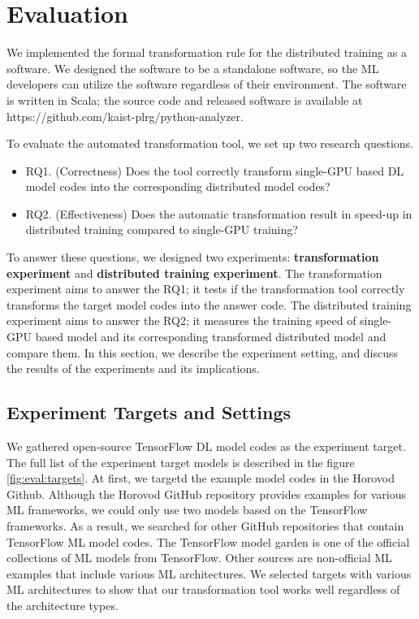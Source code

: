 \section{Evaluation}\label{sec:eval}

We implemented the formal transformation rule for the distributed training
as a software. We designed the software to be a standalone software, so 
the ML developers can utilize the software regardless of their environment. 
The software is written in Scala; the source code and released software
is available at https://github.com/kaist-plrg/python-analyzer.

To evaluate the automated transformation tool, we set up two research
questions.

\begin{itemize}
\item RQ1. (Correctness) Does the tool correctly transform single-GPU based DL model codes into
the corresponding distributed model codes?

\item RQ2. (Effectiveness) Does the automatic transformation result in speed-up 
in distributed training compared to single-GPU training?
\end{itemize}

To answer these questions,  
we designed two experiments: \textbf{transformation experiment} and
\textbf{distributed training experiment}.
The transformation experiment aims to answer the RQ1; it tests if the
transformation tool correctly transforms the target model codes into
the answer code.
The distributed training experiment aims to answer the RQ2;
it measures the training speed of single-GPU based model and its
corresponding transformed distributed model and compare them.
In this section, we describe the experiment setting,
and discuss the results of the experiments and its implications.

\subsection{Experiment Targets and Settings}

We gathered open-source TensorFlow DL model codes as the experiment target.
The full list of the experiment target models is described in the
figure \ref{fig:eval:targets}.
At first, we targetd the example model codes in the Horovod 
Github\cite{horovodgithub}. Although the Horovod GitHub repository provides
examples for various ML frameworks, we could only use two models based on the
TensorFlow frameworks. As a result, we searched for other GitHub repositories
that contain TensorFlow ML model codes.
The TensorFlow model garden\cite{tfmodelgarden} is one of the official
collections of ML models from TensorFlow.
Other sources\cite{tfexamplesdamien}\cite{cifar10github}\cite{tf2tutogithub} are
non-official ML examples that include various ML architectures.
We selected targets with various ML architectures to show that
our transformation tool works well regardless of the architecture types.

